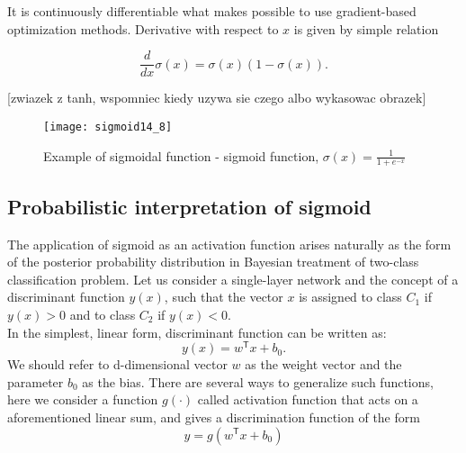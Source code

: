 \documentclass[]{article}
\theoremstyle{definition}
\begin{document}
It is continuously differentiable what makes possible to use gradient-based optimization methods. Derivative with respect to $x$ is given by simple relation

\begin{equation}
\frac{d}{dx} \sigma(x)= \sigma(x)\left(1 - \sigma(x)\right).
\end{equation}

[zwiazek z tanh, wspomniec kiedy uzywa sie czego albo wykasowac obrazek]

\begin{figure}[h!]
	\centering
	\texttt{[image: sigmoid14\_8]}
	\caption{Example of sigmoidal function - sigmoid function, $\sigma(x) = \frac{1}{1+e^{-x}}$}
\end{figure} 

\newpage

\subsection{Probabilistic interpretation of sigmoid}


The application of sigmoid as an activation function arises naturally as the form of the posterior probability distribution in Bayesian treatment of two-class classification problem.
%
Let us consider a single-layer network and the concept of a discriminant function $y(x)$, such that the vector $x$ is assigned to class $C_1$ if $y(x) > 0$ and to class $C_2$ if $y(x) < 0$.
\\

In the simplest, linear form, discriminant function can be written as:
%
\begin{equation}
y(x) = w^\mathsf{T} x + b_0.
\end{equation}
%
We should refer to d-dimensional vector $w$ as the weight vector and the parameter $b_0$ as the bias.
There are several ways to generalize such functions, here we consider a function $g(\cdot)$ called activation function that acts on a aforementioned linear sum, and gives a discrimination function of the form
%
\begin{equation}
y = g\left(w^\mathsf{T} x + b_0 \right)
\end{equation}
%
\def\layersep{2.5cm}
\end{document}
